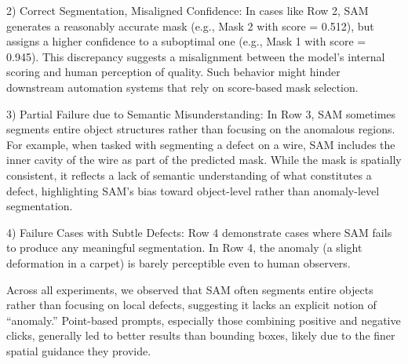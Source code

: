 \documentclass[11pt]{article}
\begin{document}
2) Correct Segmentation, Misaligned Confidence: In cases like Row 2, SAM generates a reasonably accurate mask (e.g., Mask 2 with score = 0.512), but assigns a higher confidence to a suboptimal one (e.g., Mask 1 with score = 0.945). This discrepancy suggests a misalignment between the model’s internal scoring and human perception of quality. Such behavior might hinder downstream automation systems that rely on score-based mask selection.
    
3) Partial Failure due to Semantic Misunderstanding: In Row 3, SAM sometimes segments entire object structures rather than focusing on the anomalous regions. For example, when tasked with segmenting a defect on a wire, SAM includes the inner cavity of the wire as part of the predicted mask. While the mask is spatially consistent, it reflects a lack of semantic understanding of what constitutes a defect, highlighting SAM’s bias toward object-level rather than anomaly-level segmentation.
    
4) Failure Cases with Subtle Defects: Row 4 demonstrate cases where SAM fails to produce any meaningful segmentation. In Row 4, the anomaly (a slight deformation in a carpet) is barely perceptible even to human observers.

Across all experiments, we observed that SAM often segments entire objects rather than focusing on local defects, suggesting it lacks an explicit notion of “anomaly.” Point-based prompts, especially those combining positive and negative clicks, generally led to better results than bounding boxes, likely due to the finer spatial guidance they provide.
\end{document}
